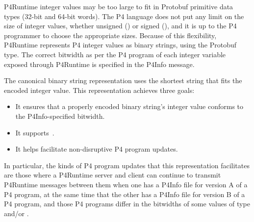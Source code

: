 \documentclass[11pt]{article}
\begin{document}
{%
\noindent{}P4Runtime integer values may be too large to fit in Protobuf primitive data
types (32-bit and 64-bit words). The P4 language does not put any limit on the
size of integer values, whether unsigned () or signed (), and it
is up to the P4 programmer to choose the appropriate sizes. Because of this
flexibility, P4Runtime represents P4 integer values as binary strings, using the
 Protobuf type. The correct bitwidth \textemdash{} as per the P4 program \textemdash{} of
each integer variable exposed through P4Runtime is specified in the P4Info
message.%

The canonical binary string representation uses the shortest string that
fits the encoded integer value. This representation achieves three goals:%

\begin{itemize}%

\item{}
It ensures that a properly encoded binary string's integer value conforms
to the P4Info-specified bitwidth.%

\item{}
It supports~.%

\item{}
It helps facilitate non-disruptive P4 program updates.%
\end{itemize}%

\noindent{}In particular, the kinds of P4 program updates that this representation
facilitates are those where a P4Runtime server and client can continue to
transmit P4Runtime messages between them when one has a P4Info file for version
A of a P4 program, at the same time that the other has a P4Info file for version
B of a P4 program, and those P4 programs differ in the bitwidths of some values
of type  and/or .%

}
\end{document}
